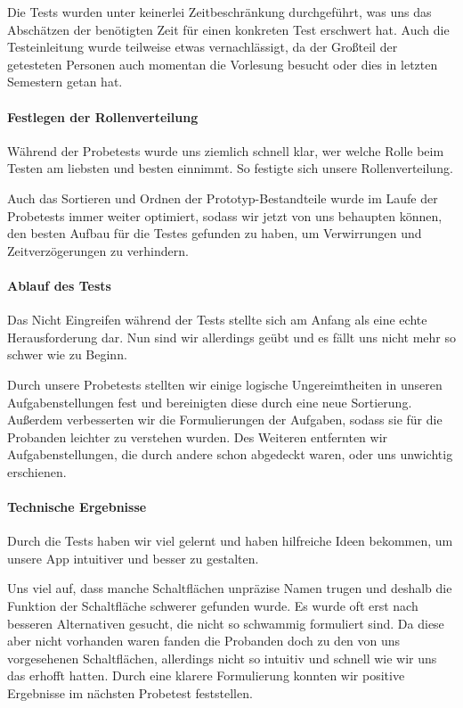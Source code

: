 Die Tests wurden unter keinerlei Zeitbeschränkung durchgeführt, was uns das Abschätzen der benötigten Zeit für einen konkreten Test erschwert hat. Auch die Testeinleitung wurde teilweise etwas vernachlässigt, da der Großteil der getesteten Personen auch momentan die Vorlesung besucht oder dies in letzten Semestern getan hat. 


\paragraph{Festlegen der Rollenverteilung}
Während der Probetests wurde uns ziemlich schnell klar, wer welche Rolle beim Testen am liebsten und besten einnimmt. So festigte sich unsere Rollenverteilung.

Auch das Sortieren und Ordnen der Prototyp-Bestandteile wurde im Laufe der Probetests immer weiter optimiert, sodass wir jetzt von uns behaupten können, den besten Aufbau für die Testes gefunden zu haben, um Verwirrungen und Zeitverzögerungen zu verhindern.

\paragraph{Ablauf des Tests}
Das Nicht Eingreifen während der Tests stellte sich am Anfang als eine echte Herausforderung dar. Nun sind wir allerdings geübt und es fällt uns nicht mehr so schwer wie zu Beginn. 

Durch unsere Probetests stellten wir einige logische Ungereimtheiten in unseren Aufgabenstellungen fest und bereinigten diese durch eine neue Sortierung. Außerdem verbesserten wir die Formulierungen der Aufgaben, sodass sie für die Probanden leichter zu verstehen wurden. Des Weiteren entfernten wir Aufgabenstellungen, die durch andere schon abgedeckt waren, oder uns unwichtig erschienen.


\paragraph{Technische Ergebnisse}
Durch die Tests haben wir viel gelernt und haben hilfreiche Ideen bekommen, um unsere App intuitiver und besser zu gestalten.

Uns viel auf, dass manche Schaltflächen unpräzise Namen trugen und deshalb die Funktion der Schaltfläche schwerer gefunden wurde. Es wurde oft erst nach besseren Alternativen gesucht, die nicht so schwammig formuliert sind. Da diese aber nicht vorhanden waren fanden die Probanden doch zu den von uns vorgesehenen Schaltflächen, allerdings nicht so intuitiv und schnell wie wir uns das erhofft hatten. Durch eine klarere Formulierung konnten wir positive Ergebnisse im nächsten Probetest feststellen.

